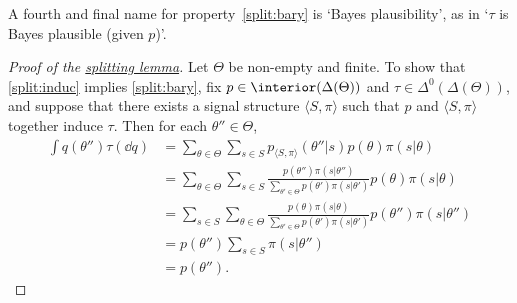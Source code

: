 A fourth and final name for property~\ref{split:bary} is `Bayes plausibility', as in `$\tau$ is Bayes plausible (given $p$)'.

\begin{proof}[Proof of the {\hyperref[lemma:split]{splitting lemma}}]
	Let $\Theta$ be non-empty and finite. To show that \ref{split:induc} implies \ref{split:bary}, fix $p \in \interior(\Delta(\Theta))$ and $\tau \in \Delta^0(\Delta(\Theta))$, and suppose that there exists a signal structure $\langle S, \pi \rangle $ such that $p$ and $\langle S, \pi \rangle $ together induce $\tau$. Then for each $\theta'' \in \Theta$,
	\begin{align*}
		\int q(\theta'') \tau( \dd q )
		&= \sum_{\theta \in \Theta} \sum_{s \in S} p_{\langle S, \pi \rangle }(\theta''|s) p(\theta) \pi( s | \theta )
		\\
		&= \sum_{\theta \in \Theta} \sum_{s \in S} \frac{p(\theta'') \pi(s|\theta'')}{\sum_{\theta' \in \Theta} p(\theta') \pi(s|\theta')} p(\theta) \pi( s | \theta )
		\\
		&= \sum_{s \in S} \sum_{\theta \in \Theta} \frac{p(\theta) \pi(s|\theta)}{\sum_{\theta' \in \Theta} p(\theta') \pi(s|\theta')} p(\theta'') \pi( s | \theta'' )
		\\
		&= p(\theta'') \sum_{s \in S} \pi(s|\theta'')
		\\
		&= p(\theta'') .
	\end{align*}


\end{proof}
